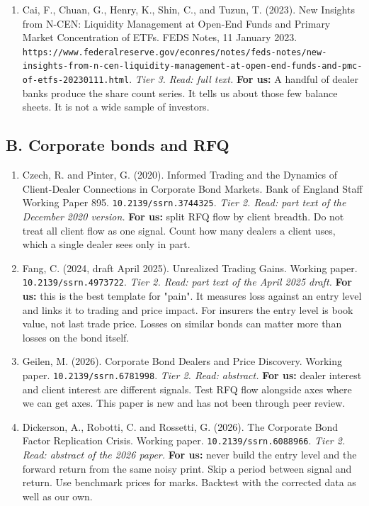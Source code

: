 \begin{enumerate}[leftmargin=*,itemsep=3pt]
\item Cai, F., Chuan, G., Henry, K., Shin, C., and Tuzun, T. (2023). New Insights from N-CEN: Liquidity Management at Open-End Funds and Primary Market Concentration of ETFs. FEDS Notes, 11 January 2023. \nolinkurl{https://www.federalreserve.gov/econres/notes/feds-notes/new-insights-from-n-cen-liquidity-management-at-open-end-funds-and-pmc-of-etfs-20230111.html}. \emph{Tier 3. Read: full text.} \textbf{For us:} A handful of dealer banks produce the share count series. It tells us about those few balance sheets. It is not a wide sample of investors.
\end{enumerate}
\subsection*{B. Corporate bonds and RFQ}
\begin{enumerate}[leftmargin=*,itemsep=3pt]
\item Czech, R. and Pinter, G. (2020). Informed Trading and the Dynamics of Client-Dealer Connections in Corporate Bond Markets. Bank of England Staff Working Paper 895. \nolinkurl{10.2139/ssrn.3744325}. \emph{Tier 2. Read: part text of the December 2020 version.} \textbf{For us:} split RFQ flow by client breadth. Do not treat all client flow as one signal. Count how many dealers a client uses, which a single dealer sees only in part.
\item Fang, C. (2024, draft April 2025). Unrealized Trading Gains. Working paper. \nolinkurl{10.2139/ssrn.4973722}. \emph{Tier 2. Read: part text of the April 2025 draft.} \textbf{For us:} this is the best template for "pain". It measures loss against an entry level and links it to trading and price impact. For insurers the entry level is book value, not last trade price. Losses on similar bonds can matter more than losses on the bond itself.
\item Geilen, M. (2026). Corporate Bond Dealers and Price Discovery. Working paper. \nolinkurl{10.2139/ssrn.6781998}. \emph{Tier 2. Read: abstract.} \textbf{For us:} dealer interest and client interest are different signals. Test RFQ flow alongside axes where we can get axes. This paper is new and has not been through peer review.
\item Dickerson, A., Robotti, C. and Rossetti, G. (2026). The Corporate Bond Factor Replication Crisis. Working paper. \nolinkurl{10.2139/ssrn.6088966}. \emph{Tier 2. Read: abstract of the 2026 paper.} \textbf{For us:} never build the entry level and the forward return from the same noisy print. Skip a period between signal and return. Use benchmark prices for marks. Backtest with the corrected data as well as our own.

\end{enumerate}
